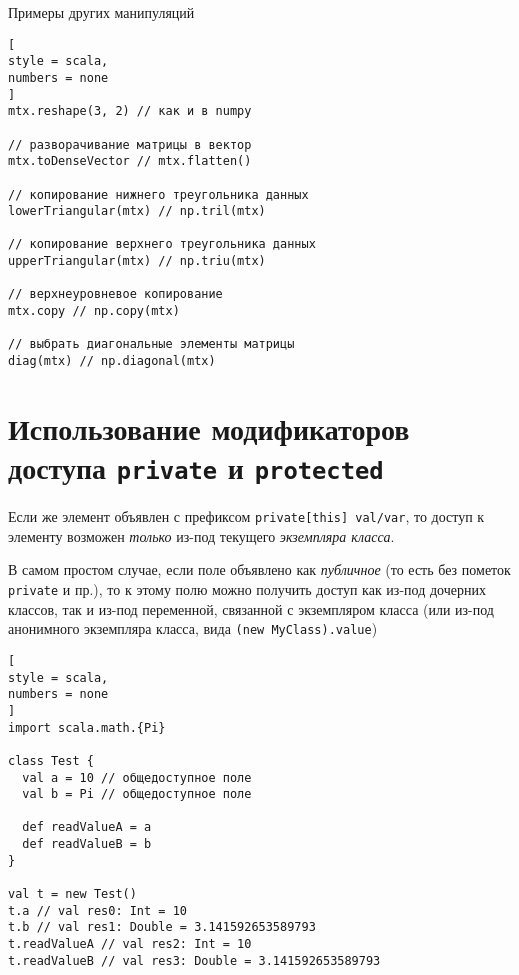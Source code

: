 \documentclass[%
	11pt,
	a4paper,
	utf8,
		]{article}
\begin{document}
Примеры других манипуляций
\begin{lstlisting}[
style = scala,
numbers = none	
]
mtx.reshape(3, 2) // как и в numpy

// разворачивание матрицы в вектор
mtx.toDenseVector // mtx.flatten()

// копирование нижнего треугольника данных
lowerTriangular(mtx) // np.tril(mtx)

// копирование верхнего треугольника данных
upperTriangular(mtx) // np.triu(mtx)

// верхнеуровневое копирование
mtx.copy // np.copy(mtx)

// выбрать диагональные элементы матрицы
diag(mtx) // np.diagonal(mtx)
\end{lstlisting}

\section{Использование модификаторов доступа \texttt{private} и \texttt{protected}}


Если же элемент объявлен с префиксом \texttt{private[this] val/var}, то доступ к элементу возможен \emph{только} из-под текущего \emph{экземпляра класса}.

В самом простом случае, если поле объявлено как \emph{публичное} (то есть без пометок \texttt{private} и пр.), то к этому полю можно получить доступ как из-под дочерних классов, так и из-под переменной, связанной с экземпляром класса (или из-под анонимного экземпляра класса, вида \texttt{(new MyClass).value})

\begin{lstlisting}[
style = scala,
numbers = none	
]
import scala.math.{Pi}

class Test {
  val a = 10 // общедоступное поле
  val b = Pi // общедоступное поле
  
  def readValueA = a
  def readValueB = b
}

val t = new Test()
t.a // val res0: Int = 10
t.b // val res1: Double = 3.141592653589793
t.readValueA // val res2: Int = 10
t.readValueB // val res3: Double = 3.141592653589793
\end{lstlisting}
\end{document}

